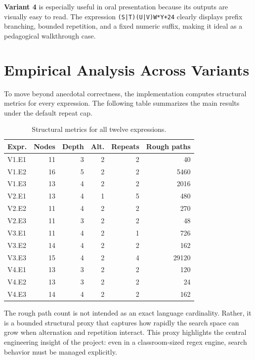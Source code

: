 \documentclass[a4paper,12pt]{article}
\begin{document}
\textbf{Variant 4} is especially useful in oral presentation because its outputs are visually easy to read. The expression \mbox{\texttt{(S|T)(U|V)W*Y+24}} clearly displays prefix branching, bounded repetition, and a fixed numeric suffix, making it ideal as a pedagogical walkthrough case.

\section{Empirical Analysis Across Variants}

To move beyond anecdotal correctness, the implementation computes structural metrics for every expression. The following table summarizes the main results under the default repeat cap.

\begin{table}[H]
    \centering
    \caption{Structural metrics for all twelve expressions.}
    \begin{tabular}{lrrrrr}
        \toprule
        \textbf{Expr.} & \textbf{Nodes} & \textbf{Depth} & \textbf{Alt.} & \textbf{Repeats} & \textbf{Rough paths} \\
        \midrule
        V1.E1 & 11 & 3 & 2 & 2 & 40 \\
        V1.E2 & 16 & 5 & 2 & 2 & 5460 \\
        V1.E3 & 13 & 4 & 2 & 2 & 2016 \\
        V2.E1 & 13 & 4 & 1 & 5 & 480 \\
        V2.E2 & 11 & 4 & 2 & 2 & 270 \\
        V2.E3 & 11 & 3 & 2 & 2 & 48 \\
        V3.E1 & 11 & 4 & 2 & 1 & 726 \\
        V3.E2 & 14 & 4 & 2 & 2 & 162 \\
        V3.E3 & 15 & 4 & 2 & 4 & 29120 \\
        V4.E1 & 13 & 3 & 2 & 2 & 120 \\
        V4.E2 & 13 & 3 & 2 & 2 & 24 \\
        V4.E3 & 14 & 4 & 2 & 2 & 162 \\
        \bottomrule
    \end{tabular}
\end{table}

The rough path count is not intended as an exact language cardinality. Rather, it is a bounded structural proxy that captures how rapidly the search space can grow when alternation and repetition interact. This proxy highlights the central engineering insight of the project: even in a classroom-sized regex engine, search behavior must be managed explicitly.
\end{document}
